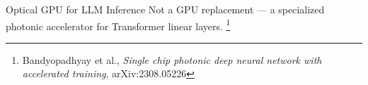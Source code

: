 \begin{frame}[shrink=10]{Optical GPU for LLM Inference}
  \vspace{0.45em}
  {\footnotesize\color{mygray}%
    Not a GPU replacement — a specialized photonic accelerator
    for Transformer linear layers.%
    \footnote{\tiny Bandyopadhyay et al.,
    \textit{Single chip photonic deep neural network with accelerated
    training}, arXiv:2308.05226}}


\end{frame}
